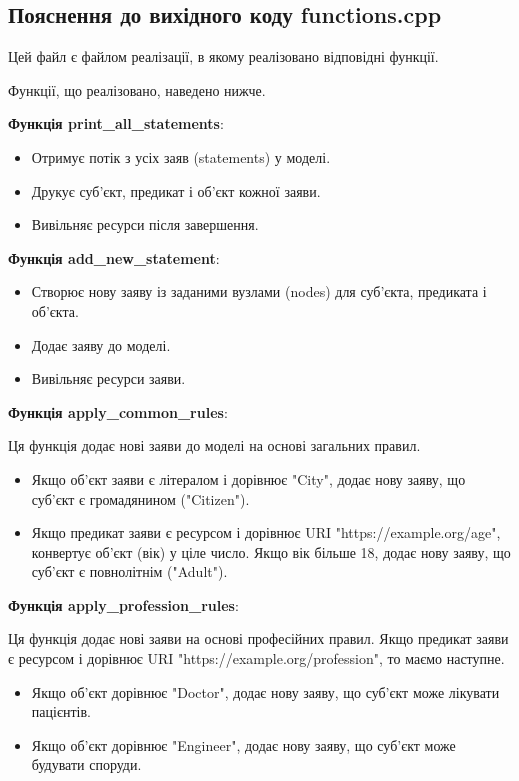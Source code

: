 \documentclass[12pt, a4paper]{article}
\begin{document}
\subsection{Пояснення до вихідного коду functions.cpp}

Цей файл є файлом реалізації, в якому реалізовано відповідні функції.

Функції, що реалізовано, наведено нижче.

\textbf{Функція print\_all\_statements}:

\begin{itemize}
    \item Отримує потік з усіх заяв (statements) у моделі.
    \item Друкує суб'єкт, предикат і об'єкт кожної заяви.
    \item Вивільняє ресурси після завершення.
\end{itemize}

\textbf{Функція add\_new\_statement}:

\begin{itemize}
    \item Створює нову заяву із заданими вузлами (nodes) для суб'єкта, предиката і об'єкта.
    \item Додає заяву до моделі.
    \item Вивільняє ресурси заяви.
\end{itemize}

\textbf{Функція apply\_common\_rules}:

Ця функція додає нові заяви до моделі на основі загальних правил.

\begin{itemize}
    \item Якщо об'єкт заяви є літералом і дорівнює "City", додає нову заяву, що суб'єкт є громадянином ("Citizen").
    \item Якщо предикат заяви є ресурсом і дорівнює URI "https://example.org/age", конвертує об'єкт (вік) у ціле число. Якщо вік більше 18, додає нову заяву, що суб'єкт є повнолітнім ("Adult").
\end{itemize}

\textbf{Функція apply\_profession\_rules}:

Ця функція додає нові заяви на основі професійних правил. Якщо предикат заяви є ресурсом і дорівнює URI "https://example.org/profession", то маємо наступне.

\begin{itemize}
    \item Якщо об'єкт дорівнює "Doctor", додає нову заяву, що суб'єкт може лікувати пацієнтів.
    \item Якщо об'єкт дорівнює "Engineer", додає нову заяву, що суб'єкт може будувати споруди.
\end{itemize}
\end{document}
